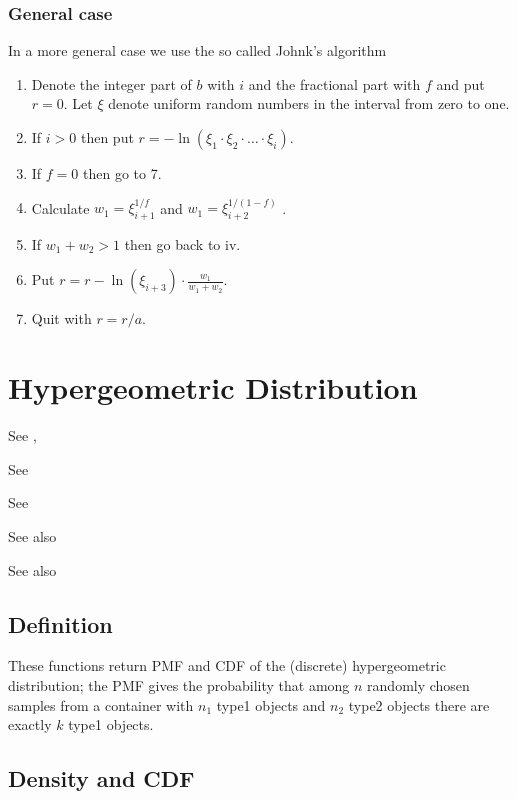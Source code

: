 \subsubsection{General case}
In a more general case we use the so called Johnk's algorithm

\begin{enumerate}
	\item Denote the integer part of $b$ with $i$ and the fractional part with $f$ and put $r = 0$. Let $\xi$ denote uniform random numbers in the interval from zero to one.
	\item If $i > 0$ then put $r = - \ln(\xi_1 \cdot \xi_2 \cdot \ldots \cdot \xi_i)$.
	\item If $f = 0$ then go to 7.
	\item Calculate $w_1 = \xi_{i+1}^{1/f}$ and $w_1 = \xi_{i+2}^{1/(1-f)}$ .
	\item If $w_1 + w_2 > 1$ then go back to iv.
	\item Put $r = r - \ln(\xi_{i+3}) \cdot \frac{w_1}{w_1+w_2}$.
	\item Quit with $r = r/a$.
\end{enumerate}






\section{Hypergeometric Distribution}
\label{HypergeometricDistribution}


See \cite{Upton_1982}, \cite{Harkness_1964}

See \cite{ling_accuracy_1984}

See \cite{Knüsel_1987}

See also \cite{Conlon_1993}

See also \cite{Casagrande_1978}

\subsection{Definition}
\label{HypergeometricDistributionDefinition}

These functions return PMF and CDF of the (discrete) hypergeometric distribution;
the PMF gives the probability that among $n$ randomly chosen samples from a container
with $n_1$ type1 objects and $n_2$ type2 objects there are exactly $k$ type1 objects.



\subsection{Density and CDF}

